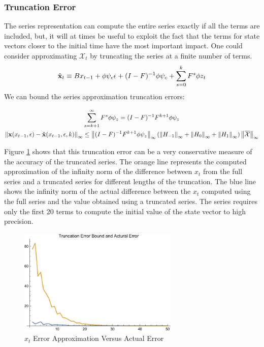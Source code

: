 \documentclass[12pt]{article}
\begin{document}
\subsubsection{Truncation Error}


The series representation can compute the entire series exactly
if all the terms are included, but, it will at times be useful to exploit the fact that
the terms for state vectors closer 
to the initial time have the most important impact.
One could consider approximating  $\mathcal{X}_t$ by 
truncating the series  at a finite number of terms.
 	 \begin{gather}
 	 \hat{\mathbf{x}}_t \equiv B x_{t-1}+ \phi \psi_\epsilon\epsilon  + (I - F)^{-1} \phi \psi_c + \sum_{s=0}^k F^s \phi z_{t}\label{theTruncSeries}
 \end{gather}
We can bound the  series approximation truncation errors:

    \begin{gather}
      \label{eq:1}
\sum_{s=k+1}^{\infty} F^s \phi \psi_z = (I -F)^{-1} F^{k+1}\phi \psi_z       \\
\left\lVert\mathbf{x}(x_{t-1},\epsilon)-\hat{\mathbf{x}}(x_{t-1},\epsilon,k)\right\rVert_\infty \le \left\lVert(I -F)^{-1} F^{k+1}\phi \psi_z\right\rVert_\infty \left ( \left\lVert H_{-1} \right\rVert_\infty+ \left\lVert H_{0} \right\rVert_\infty+ \left\lVert H_{1} \right\rVert_\infty \right )\left\lVert\overline{\mathcal{X}}\right\rVert_\infty
    \end{gather}


 Figure \ref{figArbTrunc} shows
that this truncation error can be  a very conservative measure of the accuracy
of the truncated series.  The orange line represents the computed approximation of
the infinity norm of the difference between $x_t$ from the full series and a truncated series for different lengths of the truncation.  The blue line shows the infinity norm of the actual difference between the $x_t$ computed using the full series and the value obtained using a truncated series.  The series requires only the first 20 terms to compute
the initial value of the state vector to high precision. 


\begin{figure}
  \centering


\includegraphics[width=3in]{arbTruncErr.pdf}  
  \caption{$x_t$ Error Approximation Versus Actual Error} \label{figArbTrunc}

\end{figure}
\end{document}
